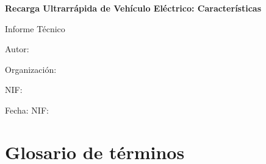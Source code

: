 \documentclass[a4paper,12pt]{article}
\let\OldTextField\TextField
\renewcommand{\TextField}[2][]{%
  \raisebox{-0.1ex}{\OldTextField[height=.95em,  bordercolor={1 1 1}, backgroundcolor={1 1 1},#1]{#2}}%
}
\begin{document}
\begin{Form}

\graphicspath{{../../../assets/imgs}}



\begin{titlepage}
    \centering
    {\scshape\LARGE  \par}
    \vspace{1cm}
    {\Huge\bfseries  Recarga Ultrarrápida de Vehículo Eléctrico: Características\par}
    \vspace{2cm}
    {\Large Informe Técnico \par} 
    \vspace{1cm}
    \vfill
    Autor: \TextField[name=Tecnico,width=6cm,default=Juan Pérez]{} \par
    Organización: \TextField[name=Organizacion,width=6cm,default=CalcAE]{} \par
    NIF: \TextField[name=NIF,width=6cm,default=12345678]{} \par
    Fecha:  NIF: \TextField[name=Fecha,width=6cm,default=\today]{} \par
\end{titlepage}



\begin{abstract}
La Regulación de Infraestructura para Combustibles Alternativos (\textbf{AFIR}, por sus siglas en inglés) es una iniciativa legislativa de la Unión Europea destinada a establecer un marco normativo para el desarrollo y la implementación de infraestructuras que soporten combustibles alternativos. Esto incluye la infraestructura necesaria para la recarga de vehículos eléctricos, así como para otros tipos de combustibles alternativos como el hidrógeno, el gas natural licuado (GNL), y el gas natural comprimido (GNC).
\end{abstract}


\tableofcontents

\section*{Glosario de términos}


\end{Form}
\end{document}
